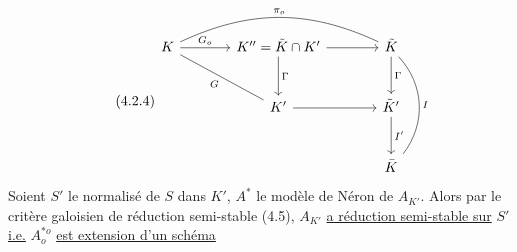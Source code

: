 \begin{equation}\tag{4.2.4}
\begin{tikzcd}[column sep=large, row sep=large]
K \arrow[r, "G_o"] \arrow[rd, dash, "G"'] \arrow[rr, bend left=25, dash, "\pi_o"] & K''=\tilde{K}\cap K' \arrow[r] \arrow[d, "\Gamma"] & \tilde{K} \arrow[d, "\Gamma"] \arrow[dd, bend left=40, dash, "I"] \\
& K' \arrow[r] & \tilde{K}' \arrow[d, "I'"] \\
& & \bar{K}
\end{tikzcd}
\end{equation}
Soient $S'$ le normalisé de $S$ dans $K'$, $A^*$ le modèle de Néron de $A_{K'}$. Alors par le critère galoisien de réduction semi-stable (4.5), $A_{K'}$ \underline{a réduction semi-stable sur} $S'$ \underline{i.e.} $A^{*o}_{o}$ \underline{est extension d'un schéma}



